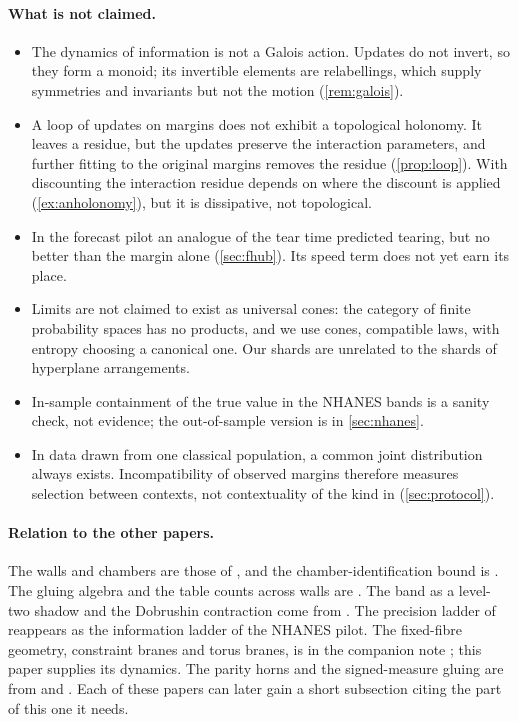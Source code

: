 \documentclass[11pt]{article}
\theoremstyle{definition}
\theoremstyle{remark}
\begin{document}
\paragraph{What is not claimed.}
\begin{itemize}[leftmargin=*,nosep]
\item The dynamics of information is not a Galois action. Updates do not invert, so they form a monoid; its invertible
  elements are relabellings, which supply symmetries and invariants but not the motion (\cref{rem:galois}).
\item A loop of updates on margins does not exhibit a topological holonomy. It leaves a residue, but the updates
  preserve the interaction parameters, and further fitting to the original margins removes the residue (\cref{prop:loop}). With
  discounting the interaction residue depends on where the discount is applied (\cref{ex:anholonomy}), but it is dissipative, not
  topological.
\item In the forecast pilot an analogue of the tear time predicted tearing, but no better than the margin alone
  (\cref{sec:fhub}). Its speed term does not yet earn its place.
\item Limits are not claimed to exist as universal cones: the category of finite probability spaces has no products, and we use
  cones, compatible laws, with entropy choosing a canonical one. Our shards are unrelated to the shards of hyperplane arrangements.
\item In-sample containment of the true value in the NHANES bands is a sanity check, not evidence; the out-of-sample
  version is in \cref{sec:nhanes}.
\item In data drawn from one classical population, a common joint distribution always exists. Incompatibility of observed
  margins therefore measures selection between contexts, not contextuality of the kind in \cite{Conditionals}
  (\cref{sec:protocol}).
\end{itemize}

\paragraph{Relation to the other papers.} The walls and chambers are those of \cite[Def.~6.3, Prop.~6.6]{Conditionals}, and the
chamber-identification bound is \cite[Prop.~12.2]{Conditionals}. The gluing algebra and the table counts across walls are
\cite[Thm.~2.2, Prop.~7.3]{Algebras}. The band as a level-two shadow and the Dobrushin contraction come from
\cite[Prop.~9.14, Prop.~11.2]{Tower}. The precision ladder of \cite[Thm.~3.5]{Attribution} reappears as the information
ladder of the NHANES pilot. The fixed-fibre geometry, constraint branes and torus branes, is in the companion note
\cite{Bridges}; this paper supplies its dynamics. The parity horns and the signed-measure gluing are from \cite[Thm.~4.3]{Conditionals} and
\cite[Prop.~35.1]{ThreeLayers}. Each of these papers can later gain a short subsection citing the part of this one it
needs.
\end{document}
